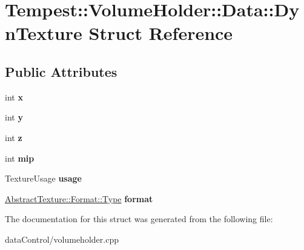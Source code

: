 \hypertarget{struct_volume_holder_1_1_data_1_1_dyn_texture}{\section{Tempest\+:\+:Volume\+Holder\+:\+:Data\+:\+:Dyn\+Texture Struct Reference}
\label{struct_volume_holder_1_1_data_1_1_dyn_texture}
}
\subsection*{Public Attributes}
\begin{DoxyCompactItemize}
\item 
\hypertarget{struct_volume_holder_1_1_data_1_1_dyn_texture_a56a7a0c7eecf0be616a87ee89922357e}{int {\bfseries x}}\label{struct_volume_holder_1_1_data_1_1_dyn_texture_a56a7a0c7eecf0be616a87ee89922357e}

\item 
\hypertarget{struct_volume_holder_1_1_data_1_1_dyn_texture_af8683a8728cd5a724a7fe2c9d5220bc8}{int {\bfseries y}}\label{struct_volume_holder_1_1_data_1_1_dyn_texture_af8683a8728cd5a724a7fe2c9d5220bc8}

\item 
\hypertarget{struct_volume_holder_1_1_data_1_1_dyn_texture_a5ca86e588e35e43be0d2df88716da1b5}{int {\bfseries z}}\label{struct_volume_holder_1_1_data_1_1_dyn_texture_a5ca86e588e35e43be0d2df88716da1b5}

\item 
\hypertarget{struct_volume_holder_1_1_data_1_1_dyn_texture_aa4c3a7e51f95f9e81c1203758ed4793d}{int {\bfseries mip}}\label{struct_volume_holder_1_1_data_1_1_dyn_texture_aa4c3a7e51f95f9e81c1203758ed4793d}

\item 
\hypertarget{struct_volume_holder_1_1_data_1_1_dyn_texture_a98ecc7a7a1e306162882ef01a261a42e}{Texture\+Usage {\bfseries usage}}\label{struct_volume_holder_1_1_data_1_1_dyn_texture_a98ecc7a7a1e306162882ef01a261a42e}

\item 
\hypertarget{struct_volume_holder_1_1_data_1_1_dyn_texture_ad89b269d8abfa36170e25e959f05cff0}{\hyperlink{struct_tempest_1_1_abstract_texture_1_1_format_a231a1f516e53783bf72c713669b115b3}{Abstract\+Texture\+::\+Format\+::\+Type} {\bfseries format}}\label{struct_volume_holder_1_1_data_1_1_dyn_texture_ad89b269d8abfa36170e25e959f05cff0}

\end{DoxyCompactItemize}


The documentation for this struct was generated from the following file\+:\begin{DoxyCompactItemize}
\item 
data\+Control/volumeholder.\+cpp\end{DoxyCompactItemize}
